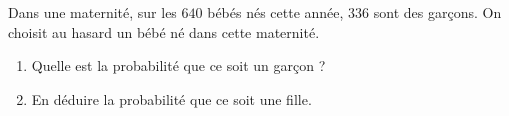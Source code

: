 \begin{exo}
	Dans une maternité, sur les $640$ bébés nés cette année, $336$ sont des garçons. On choisit au hasard un bébé né dans cette maternité.
	\begin{enumerate}
		\item Quelle est la probabilité que ce soit un garçon ?
		\item En déduire la probabilité que ce soit une fille.
	\end{enumerate}
\end{exo}
